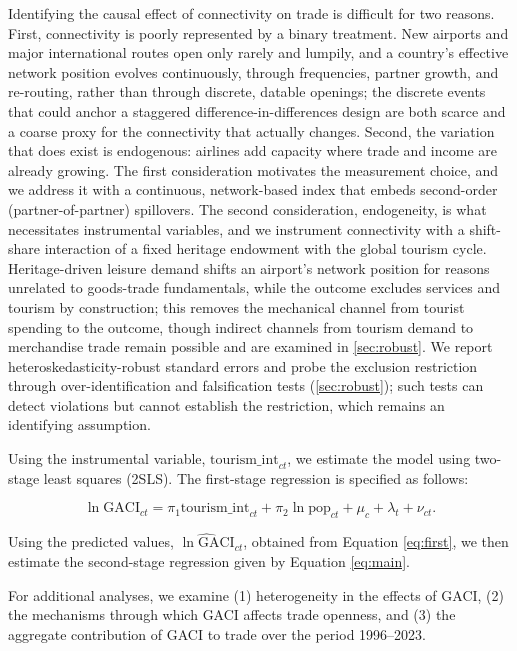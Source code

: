 Identifying the causal effect of connectivity on trade is difficult for two
reasons. First, connectivity is poorly represented by a binary treatment. New
airports and major international routes open only rarely and lumpily, and a
country's effective network position evolves continuously, through
frequencies, partner growth, and re-routing, rather than through discrete,
datable openings; the discrete events that could anchor a staggered
difference-in-differences design are both scarce and a coarse proxy for the
connectivity that actually changes. Second, the variation that does exist is
endogenous: airlines add capacity where trade and income are already growing.
The first consideration motivates the measurement choice, and we address it
with a continuous, network-based index that embeds second-order
(partner-of-partner) spillovers. The second consideration, endogeneity, is
what necessitates instrumental variables, and we instrument connectivity with
a shift-share interaction
\citep{GoldsmithPinkham_2020,Borusyak_2022} of a fixed heritage endowment with
the global tourism cycle. Heritage-driven leisure demand shifts an airport's
network position for reasons unrelated to goods-trade fundamentals, while the
outcome excludes services and tourism by construction; this removes the
mechanical channel from tourist spending to the outcome, though indirect
channels from tourism demand to merchandise trade remain possible and are
examined in \ref{sec:robust}. We report
heteroskedasticity-robust standard errors and probe the exclusion restriction
through over-identification and falsification tests (\ref{sec:robust}); such
tests can detect violations but cannot establish the restriction, which
remains an identifying assumption.

Using the instrumental variable, $\text{tourism\_int}_{ct}$, we estimate the model using two-stage least squares (2SLS). The first-stage regression is specified as follows:

\begin{equation}
\ln\mathrm{GACI}_{ct} = \pi_1\text{tourism\_int}_{ct} + \pi_2\ln\text{pop}_{ct} +  \mu_c + \lambda_t + \nu_{ct}.
  \label{eq:first}
  \end{equation}

Using the predicted values, $\widehat{\ln\mathrm{GACI}}_{ct}$, obtained from Equation \eqref{eq:first}, we then estimate the second-stage regression given by Equation \eqref{eq:main}.

For additional analyses, we examine (1) heterogeneity in the effects of GACI, (2) the mechanisms through which GACI affects trade openness, and (3) the aggregate contribution of GACI to trade over the period 1996--2023.

